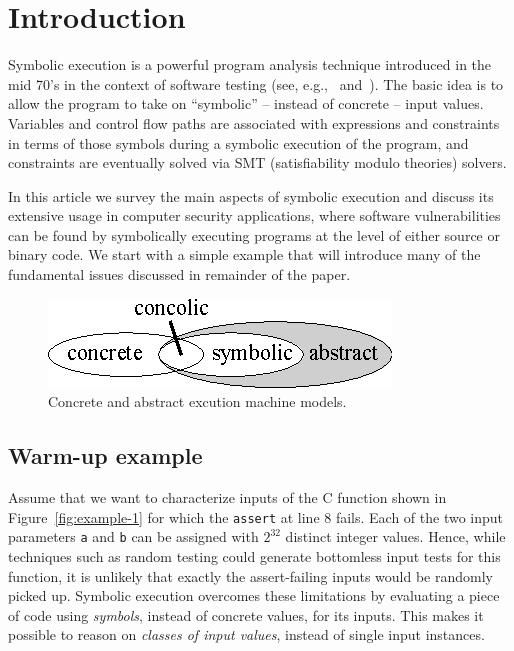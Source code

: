 
\section{Introduction}

Symbolic execution is a powerful program analysis technique introduced in the mid 70's in the context of software testing (see, e.g.,~{\cite{K-CACM76} and~\cite{H-TSE77}}). The basic idea is to allow the program to take on ``symbolic'' -- instead of concrete -- input values. Variables and control flow paths are associated with expressions and constraints in terms of those symbols during a symbolic execution of the program, and constraints are eventually solved via SMT (satisfiability modulo theories) solvers.

In this article we survey the main aspects of symbolic execution and discuss its extensive usage in computer security applications, where software vulnerabilities can be found by symbolically executing programs at the level of either source or binary code.
We start with a simple example that will introduce many of the fundamental issues discussed in remainder of the paper.

\begin{figure}[t]
\centering
\includegraphics[width=0.35\columnwidth]{images/concrete-abstract.eps} 
\caption{Concrete and abstract excution machine models.}
\label{fig:concrete-symbolic}
\end{figure}

\subsection{Warm-up example}
\label{symbolic-execution-example}

Assume that we want to characterize inputs of the C function shown in Figure~\ref{fig:example-1} for which the {\tt assert} at line 8 fails. Each of the two input parameters {\tt a} and {\tt b} can be assigned with $2^{32}$ distinct integer values. Hence, while techniques such as random testing could generate bottomless input tests for this function, it is unlikely that exactly the assert-failing inputs would be randomly picked up. 
Symbolic execution overcomes these limitations by evaluating a piece of code using {\em symbols}, instead of concrete values, for its inputs. This makes it possible to reason on {\em classes of input values}, instead of single input instances. 

